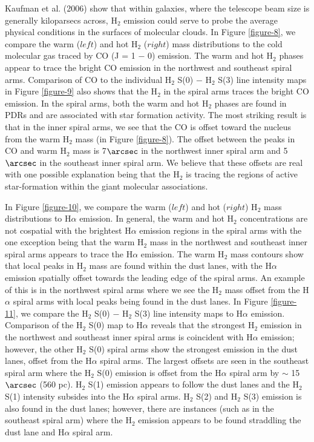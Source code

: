\documentclass[manuscript]{aastex}
\begin{document}
Kaufman et al. (2006) show that within galaxies, where the
telescope beam size is generally kiloparsecs across, H$_2$
emission could serve to probe the average physical 
conditions in the surfaces of molecular clouds.  In Figure 
\ref{figure-8}, we compare the warm ($left$) and hot
H$_2$ ($right$) mass distributions to the cold molecular 
gas traced by CO (J = 1 $-$ 0) emission.  The warm and hot 
H$_2$ phases appear to trace the bright CO emission
in the northwest and southeast spiral arms. Comparison 
of CO to the individual H$_2$  S(0) $-$ H$_2$ S(3) line intensity 
maps in Figure \ref{figure-9} also shows that the H$_2$ in 
the spiral arms traces the bright CO emission.  
In the spiral arms, both the warm and hot H$_2$ 
phases are found in PDRs and are associated 
with star formation activity.  The most 
striking result is that in the inner spiral arms, we see that the
CO is offset toward the nucleus from the 
warm H$_2$ mass (in Figure \ref{figure-8}).
The offset between the peaks in CO and warm H$_2$ mass is
7$\arcsec$ in the northwest inner spiral arm and 5$\arcsec$ in the
southeast inner spiral arm.  We believe that these offsets are real with
one possible explanation being that the H$_2$ is tracing the
regions of active star-formation within the giant molecular
associations.  

In Figure \ref{figure-10}, we compare the warm ($left$) and hot ($right$)
H$_2$ mass distributions to H$\alpha$ emission.  In general,
the warm and hot H$_2$ concentrations are not cospatial with
the brightest H$\alpha$ emission regions in the spiral arms with the one
exception being that the warm H$_2$ mass in 
the northwest and southeast inner spiral
arms appears to trace the H$\alpha$ emission.  The warm H$_2$
mass contours show that local peaks in H$_2$ mass are found
within the dust lanes, with the H$\alpha$ emission spatially 
offset towards the leading edge of the spiral arms.  
An example of this is in the northwest spiral
arms where we see the H$_2$ mass offset from the H$\alpha$
spiral arms with local peaks being found in the dust lanes.
In Figure \ref{figure-11}, we compare the H$_2$ S(0) $-$
H$_2$ S(3) line intensity maps to H$\alpha$ emission.
Comparison of the H$_2$ S(0) map to H$\alpha$ reveals that
the strongest H$_2$ emission in the northwest and southeast
inner spiral arms is coincident with H$\alpha$ emission; however, the
other H$_2$ S(0) spiral arms show the strongest emission in
the dust lanes, offset from the H$\alpha$ spiral arms.  The largest
offsets are seen in the southeast spiral arm where the H$_2$
S(0) emission is offset from the H$\alpha$ spiral arm by $\sim$
15$\arcsec$ (560 pc).  H$_2$ S(1) emission appears to follow
the dust lanes and the H$_2$ S(1) intensity subsides into the
H$\alpha$ spiral arms.  H$_2$ S(2) and H$_2$ S(3)
emission is also found in the dust lanes; however, there are instances
(such as in the southeast spiral arm) where the H$_2$
emission appears to be found straddling the dust lane and H$\alpha$
spiral arm.
\end{document}
